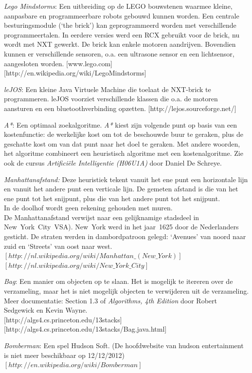 \documentclass[eind]{penoverslag}
\begin{document}
\begin{thebibliography}{9}
\textit{Lego Mindstorms}:  Een uitbreiding op de LEGO bouwstenen waarmee kleine, aanpasbare en programmeerbare robots gebouwd kunnen worden. Een centrale besturingsmodule (`the brick') kan geprogrammeerd worden met verschillende programmeertalen. In eerdere versies werd een RCX gebruikt voor de brick, nu wordt met NXT gewerkt. De brick kan enkele motoren aandrijven. Bovendien kunnen er verschillende sensoren, o.a. een ultrasone sensor en een lichtsensor, aangesloten worden.  \mbox{[www.lego.com]} \mbox{[http://en.wikipedia.org/wiki/Lego\textendash Mindstorms]}

\textit{leJOS}: Een kleine Java Virtuele Machine die toelaat de NXT-brick te programmeren. leJOS voorziet verschillende klassen die o.a. de motoren aansturen en een bluetoothverbinding opzetten.  \mbox{[http://lejos.sourceforge.net/]}

\textit{A*}: Een optimaal zoekalgoritme. \textit{A*} kiest zijn volgende punt op basis van een kostenfunctie: de werkelijke kost om tot de beschouwde buur te geraken, plus de geschatte kost om van dat punt naar het doel te geraken. Met andere woorden, het algoritme combineert een heuristisch algoritme met een kostenalgoritme. Zie ook de cursus \textit{Artifici\"ele Intelligentie (H06U1A)} door Daniel De Schreye.

\textit{Manhattanafstand:} Deze heuristiek tekent vanuit het ene punt een horizontale lijn en vanuit het andere punt een verticale lijn. De gemeten afstand is die van het ene punt tot het snijpunt, plus die van het andere punt tot het snijpunt.\\
In de doolhof wordt geen rekening gehouden met muren.\\
De Manhattanafstand verwijst naar een gelijknamige stadsdeel in New~York~City~VSA). New~York werd in het jaar~1625 door de Nederlanders gesticht. De straten werden in dambordpatroon gelegd: `Avenues' van noord naar zuid en `Streets' van oost naar west.\\
\mbox{$[http://nl.wikipedia.org/wiki/Manhattan\_(New\_York)]$}\\ \mbox{$[http://nl.wikipedia.org/wiki/New\_York\_City]$}

\textit{Bag}: Een manier om objecten op te slaan. Het is mogelijk te itereren over de verzameling, maar het is niet mogelijk objecten te verwijderen uit de verzameling. Meer documentatie: Section 1.3 of \textit{Algorithms, 4th Edition} door Robert Sedgewick en Kevin Wayne.\\
\mbox{[http://algs4.cs.princeton.edu/13stacks]} \mbox{[http://algs4.cs.princeton.edu/13stacks/Bag.java.html]}

\textit{Bomberman}: Een spel Hudson Soft. (De hoofdwebsite van hudson entertainment is niet meer beschikbaar op 12/12/2012)\\ \mbox{$[http://en.wikipedia.org/wiki/Bomberman]$}

\end{thebibliography}
\end{document}
